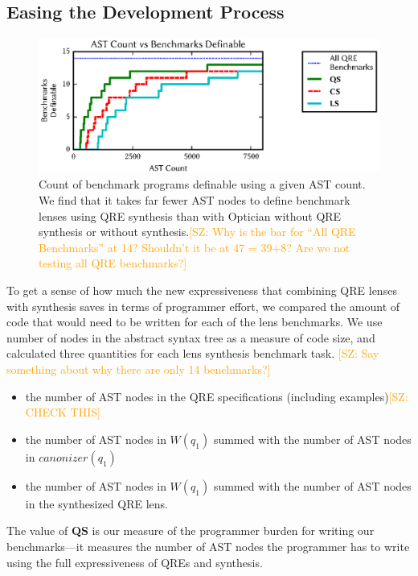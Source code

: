 \documentclass[acmsmall,review,anonymous]{acmart}
\newcommand{\FINISH}[3]{\ifdraft\textcolor{#1}{[#2: #3]}\fi}
\newcommand{\saz}[1]{\FINISH{orange}{SZ}{#1}}
\newcommand{\kw}[1]{\ensuremath{\mathit{#1}}}
\newcommand{\canonizer}{\ensuremath{\kw{canonizer}}}
\newcommand{\QRESize}{\textbf{QS}}
\newcommand{\CanonizerAndSpecSize}{\textbf{CS}}
\newcommand{\LensAndSpecSize}{\textbf{LS}}
\begin{document}
\subsection{Easing the Development Process}

\begin{figure}[t]
\includegraphics{generated-graphs/asts.eps}
\caption{Count of benchmark programs definable using a given AST count. We find
that it takes far fewer AST nodes to define benchmark lenses using QRE
synthesis than with Optician without QRE synthesis or without synthesis.\saz{Why
is the bar for ``All QRE Benchmarks'' at 14? Shouldn't it be at 47 = 39+8? Are
we not testing all QRE benchmarks?}}
\label{fig:asts}
\end{figure}

To get a sense of how much the new expressiveness that combining QRE lenses with
synthesis saves in terms of programmer effort, we compared the amount of code
that would need to be written for each of the lens benchmarks.  We use number of
nodes in the abstract syntax tree as a measure of code size, and calculated
three quantities for each lens synthesis benchmark task.  \saz{Say something
  about why there are only 14 benchmarks?}
%
\begin{itemize}
  \item[\QRESize{}] the number of AST nodes in the QRE
  specifications (including examples)\saz{CHECK THIS}
  \item[\CanonizerAndSpecSize{}]  the number of
  AST nodes in $W(q_1)$ summed with the number of AST nodes in $\canonizer(q_1)$
  \item[\LensAndSpecSize{}] the number of AST nodes
  in $W(q_1)$ summed with the number of AST nodes in the synthesized QRE lens.
\end{itemize}

The value of \QRESize{} is our measure of the programmer burden for
writing our benchmarks---it measures the number of AST nodes the programmer has
to write using the full expressiveness of QREs and synthesis.
\end{document}
